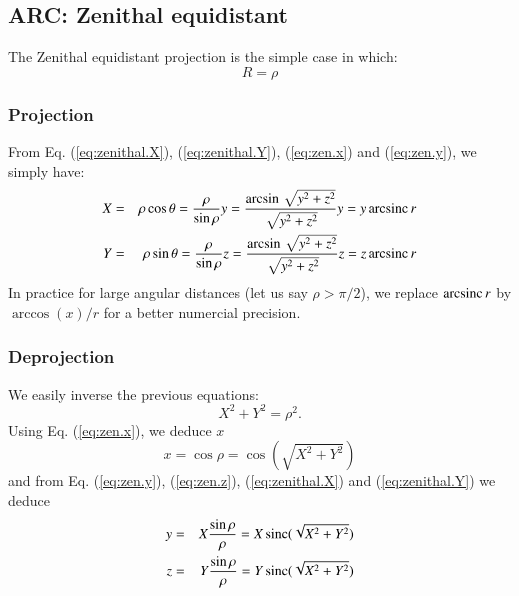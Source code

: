 \subsection{ARC: Zenithal equidistant}

  The Zenithal equidistant projection is the simple case in which:
  \begin{equation}
    R = \rho
  \end{equation}

  \subsubsection{Projection}

    From Eq. (\ref{eq:zenithal.X}), (\ref{eq:zenithal.Y}), (\ref{eq:zen.x}) and (\ref{eq:zen.y}),
    we simply have:
    \begin{eqnarray}
      X & = & \rho\cos\theta = \frac{\rho}{\sin\rho}y
              = \frac{\arcsin\sqrt{y^2 + z^2}}{\sqrt{y^2 + z^2}}y
              = y\operatorname{arcsinc} r \\
      Y & = & \rho\sin\theta = \frac{\rho}{\sin\rho}z
              = \frac{\arcsin\sqrt{y^2 + z^2}}{\sqrt{y^2 + z^2}}z
              = z\operatorname{arcsinc} r 
    \end{eqnarray}
    In practice for large angular distances (let us say $\rho>\pi/2$), we 
    replace $\operatorname{arcsinc} r$ by $\arccos(x) / r$ for a better numercial precision.

  \subsubsection{Deprojection}
  
    We easily inverse the previous equations:
    \begin{equation}
      X^2 + Y^2 = \rho^2.
    \end{equation}
    Using Eq. (\ref{eq:zen.x}), we deduce $x$
    \begin{equation}
      x = \cos\rho = \cos(\sqrt{X^2 + Y^2})
    \end{equation}
    and from Eq. (\ref{eq:zen.y}), (\ref{eq:zen.z}), (\ref{eq:zenithal.X}) and (\ref{eq:zenithal.Y})
    we deduce
    \begin{eqnarray}
      y & = & X \frac{\sin\rho}{\rho} = X \operatorname{sinc}(\sqrt{X^2 + Y^2}) \\  
      z & = & Y \frac{\sin\rho}{\rho} = Y \operatorname{sinc}(\sqrt{X^2 + Y^2})
    \end{eqnarray}


